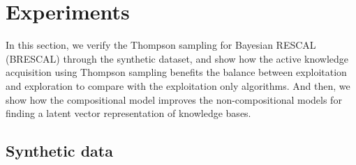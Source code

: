 \section{Experiments}
In this section, we verify the Thompson sampling for Bayesian RESCAL (BRESCAL) 
through the synthetic dataset, and show how 
the active knowledge acquisition using Thompson sampling benefits the balance between exploitation and exploration
to compare with the exploitation only algorithms. And then, we show how the compositional model
improves the non-compositional models for finding a latent vector representation of knowledge bases.

\subsection{Synthetic data}
